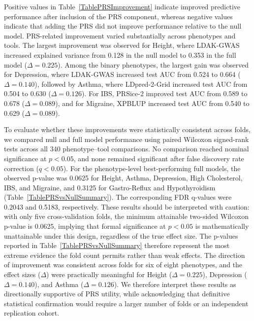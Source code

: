 \documentclass[pdflatex,sn-basic]{sn-jnl}
\begin{document}
Positive values in Table~\ref{TablePRSImprovement} indicate improved predictive performance after inclusion of the PRS component, whereas negative values indicate that adding the PRS did not improve performance relative to the null model. PRS-related improvement varied substantially across phenotypes and tools. The largest improvement was observed for Height, where LDAK-GWAS increased explained variance from 0.128 in the null model to 0.353 in the full model ($\Delta = 0.225$). Among the binary phenotypes, the largest gain was observed for Depression, where LDAK-GWAS increased test AUC from 0.524 to 0.664 ($\Delta = 0.140$), followed by Asthma, where LDpred-2-Grid increased test AUC from 0.504 to 0.630 ($\Delta = 0.126$). For IBS, PRSice-2 improved test AUC from 0.589 to 0.678 ($\Delta = 0.089$), and for Migraine, XPBLUP increased test AUC from 0.540 to 0.629 ($\Delta = 0.089$).

To evaluate whether these improvements were statistically consistent across folds, we compared null and full model performance using paired Wilcoxon signed-rank tests across all 340 phenotype--tool comparisons. No comparison reached nominal significance at $p < 0.05$, and none remained significant after false discovery rate correction ($q < 0.05$). For the phenotype-level best-performing full models, the observed p-value was 0.0625 for Height, Asthma, Depression, High Cholesterol, IBS, and Migraine, and 0.3125 for Gastro-Reflux and Hypothyroidism (Table~\ref{TablePRSvsNullSummary}). The corresponding FDR q-values were 0.2043 and 0.5183, respectively. These results should be interpreted with caution: with only five cross-validation folds, the minimum attainable two-sided Wilcoxon p-value is 0.0625, implying that formal significance at $p < 0.05$ is mathematically unattainable under this design, regardless of the true effect size. The p-values reported in Table~\ref{TablePRSvsNullSummary} therefore represent the most extreme evidence the fold count permits rather than weak effects. The direction of improvement was consistent across folds for six of eight phenotypes, and the effect sizes ($\Delta$) were practically meaningful for Height ($\Delta = 0.225$), Depression ($\Delta = 0.140$), and Asthma ($\Delta = 0.126$). We therefore interpret these results as directionally supportive of PRS utility, while acknowledging that definitive statistical confirmation would require a larger number of folds or an independent replication cohort.
\end{document}
